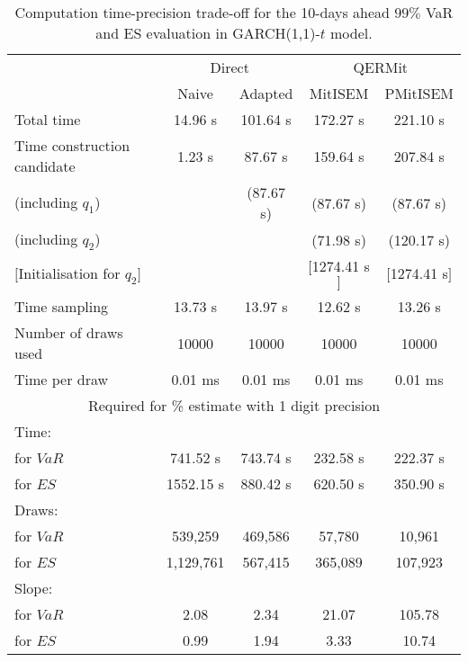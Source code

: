 { \renewcommand{\arraystretch}{1.3} 
\begin{table}[h] 
\centering 
\caption{Computation time-precision trade-off for the 10-days ahead  $99\%$ VaR and ES evaluation in GARCH(1,1)-$t$ model.} 
\label{tab:time_precision_t_garch2_noS} 
\begin{tabular}{lcccc}  
  & \multicolumn{2}{c}{Direct} & \multicolumn{2}{c}{QERMit}  \\ \cline{2-5} 
  & Naive & Adapted & MitISEM & PMitISEM  \\ \hline 
Total time & 14.96 s & 101.64 s & 172.27 s & 221.10 s \\ 
Time construction candidate & 1.23 s & 87.67 s & 159.64 s & 207.84 s \\ 
 (including $q_{1}$) &   &  (87.67 s) & (87.67 s) & (87.67 s) \\ 
 (including $q_{2}$) &   &  & (71.98 s) & (120.17 s) \\ 
$[$Initialisation for $q_{2}$$]$&   &   & $[$1274.41 s$]$ & $[$1274.41 s$]$ \\ 
Time sampling & 13.73 s & 13.97 s & 12.62 s & 13.26 s  \\  
Number of draws used & 10000 & 10000 & 10000 & 10000 \\ 
Time per draw & 0.01 ms & 0.01 ms & 0.01 ms & 0.01 ms \\ \hline 
\multicolumn{5}{c}{Required for \% estimate with 1 digit precision} \\ \hline 
Time: &  &  &   &  \\ 
\hspace{1cm} for $VaR$ & 741.52 s & 743.74 s & 232.58 s & 222.37 s \\ 
\hspace{1cm} for $ES$ & 1552.15 s & 880.42 s & 620.50 s & 350.90 s \\ 
Draws: &  &  &   &  \\ 
\hspace{1cm} for $VaR$ & 539,259 & 469,586  & 57,780  & 10,961  \\ 
\hspace{1cm} for $ES$ & 1,129,761 & 567,415  & 365,089   & 107,923  \\ 
\hline 
Slope: &  &  &   &  \\ 
\hspace{1cm} for $VaR$ & 2.08 & 2.34  & 21.07  & 105.78  \\ 
\hspace{1cm} for $ES$ & 0.99 & 1.94  & 3.33   & 10.74  \\  \hline 
\end{tabular} 
\end{table} 
} 
